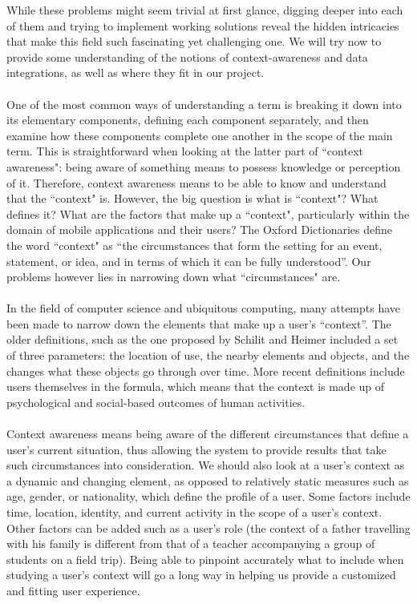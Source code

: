 While these problems might seem trivial at first glance, digging deeper into each of them and trying to implement working solutions reveal the hidden intricacies that make this field such fascinating yet challenging one. We will try now to provide some understanding of the notions of context-awareness and data integrations, as well as where they fit in our project.\\\\
One of the most common ways of understanding a term is breaking it down into its elementary components, defining each component separately, and then examine how these components complete one another in the scope of the main term. This is straightforward when looking at the latter part of ``context awareness": being aware of something means to possess knowledge or perception of it. Therefore, context awareness means to be able to know and understand that the ``context" is. However, the big question is what is ``context"? What defines it? What are the factors that make up a ``context", particularly within the domain of mobile applications and their users? The Oxford Dictionaries define the word ``context" as ``the circumstances that form the setting for an event, statement, or idea, and in terms of which it can be fully understood''. Our problems however lies in narrowing down what ``circumstances" are.\\\\
In the field of computer science and ubiquitous computing, many attempts have been made to narrow down the elements that make up a user's ``context''. The older definitions, such as the one proposed by Schilit and Heimer\cite{schilit} included a set of three parameters: the location of use, the nearby elements and objects, and the changes what these objects go through over time. More recent definitions include users themselves in the formula, which means that the context is made up of psychological and social-based outcomes of human activities\cite{dourish}\cite{tamminen}.\\\\
Context awareness means being aware of the different circumstances that define a user's current situation, thus allowing the system to provide results that take such circumstances into consideration. We should also look at a user's context as a dynamic and changing element, as opposed to relatively static measures such as age, gender, or nationality, which define the profile of a user. Some factors include time, location, identity, and current activity in the scope of a user's context. Other factors can be added such as a user's role (the context of a father travelling with his family is different from that of a teacher accompanying a group of students on a field trip). Being able to pinpoint accurately what to include when studying a user's context will go a long way in helping us provide a customized and fitting user experience.\\\\
